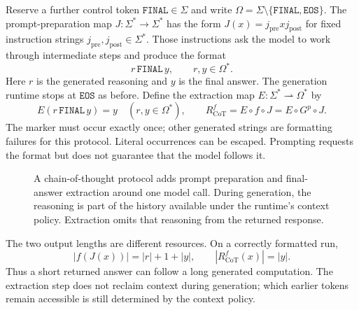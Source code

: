 \documentclass[11pt,twoside]{article}
\newcommand{\eos}{\mathtt{EOS}}
\theoremstyle{definition}
\theoremstyle{remark}
\begin{document}
Reserve a further control token $\mathtt{FINAL}\in\Sigma$ and write
$\Omega=\Sigma\setminus\{\mathtt{FINAL},\eos\}$. The prompt-preparation
map $J:\Sigma^*\to\Sigma^*$ has the form $J(x)=j_{\mathrm{pre}}xj_{\mathrm{post}}$
for fixed instruction strings $j_{\mathrm{pre}},j_{\mathrm{post}}\in\Sigma^*$.
Those instructions ask the model to work through intermediate steps and
produce the format
\[
 r\,\mathtt{FINAL}\,y,\qquad r,y\in\Omega^*.
\]
Here $r$ is the generated reasoning and $y$ is the final answer. The
generation runtime stops at $\eos$ as before. Define the extraction map
$E:\Sigma^*\rightharpoonup\Omega^*$ by
\begin{equation}
 E(r\,\mathtt{FINAL}\,y)=y\quad(r,y\in\Omega^*),\qquad
 R_{\mathrm{CoT}}^f=E\circ f\circ J=E\circ G^p\circ J.
 \label{eq:cot-runtime}
\end{equation}
The marker must occur exactly once; other generated strings are formatting
failures for this protocol. Literal occurrences can be escaped. Prompting
requests the format but does not guarantee that the model follows it.

\begin{figure}[htbp]
\centering
{}
\caption{A chain-of-thought protocol adds prompt preparation and final-answer
extraction around one model call. During generation, the reasoning is part
of the history available under the runtime's context policy. Extraction
omits that reasoning from the returned response.}
\label{fig:cot-runtime}
\end{figure}

The two output lengths are different resources. On a correctly formatted
run,
\begin{equation}
 |f(J(x))|=|r|+1+|y|,\qquad |R_{\mathrm{CoT}}^f(x)|=|y|.
 \label{eq:cot-lengths}
\end{equation}
Thus a short returned answer can follow a long generated computation.
The extraction step does not reclaim context during generation; which
earlier tokens remain accessible is still determined by the context policy.
\end{document}
